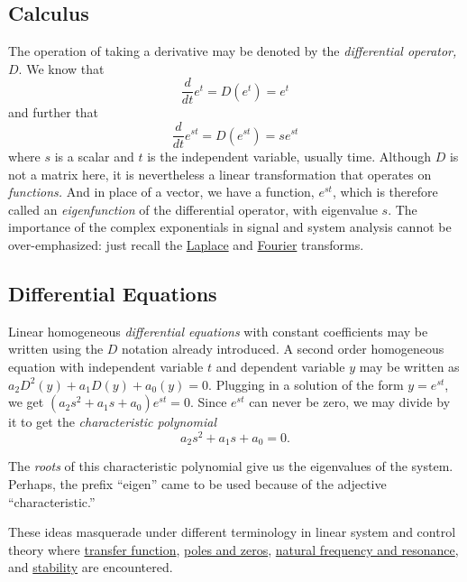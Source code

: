 \documentclass[
  12pt,
  a4paper,
]{article}
\begin{document}
\hypertarget{calculus}{%
\subsection{Calculus}\label{calculus}}

The operation of taking a derivative may be denoted by the
\emph{differential operator,} \(D\). We know that \[
\frac{d}{dt}e^{t} = D(e^{t}) = e^{t}
\] and further that \[
\frac{d}{dt}e^{st} = D(e^{st}) = se^{st}
\] where \(s\) is a scalar and \(t\) is the independent variable,
usually time. Although \(D\) is not a matrix here, it is nevertheless a
linear transformation that operates on \emph{functions.} And in place of
a vector, we have a function, \(e^{st}\), which is therefore called an
\emph{eigenfunction} of the differential operator, with eigenvalue
\(s\). The importance of the complex exponentials in signal and system
analysis cannot be over-emphasized: just recall the
\href{https://en.wikipedia.org/wiki/Laplace_transform}{Laplace} and
\href{https://en.wikipedia.org/wiki/Fourier_transform}{Fourier}
transforms.

\hypertarget{differential-equations}{%
\subsection{Differential Equations}\label{differential-equations}}

Linear homogeneous \emph{differential equations} with constant
coefficients may be written using the \(D\) notation already introduced.
A second order homogeneous equation with independent variable \(t\) and
dependent variable \(y\) may be written as
\(a_2D^2(y) + a_1D(y) + a_0(y) = 0\). Plugging in a solution of the form
\(y = e^{st}\), we get \((a_2s^2 + a_1s + a_0)e^{st} = 0.\) Since
\(e^{st}\) can never be zero, we may divide by it to get the
\emph{characteristic polynomial} \begin{equation}
a_2s^2 + a_1s + a_0 = 0.
\label{eq:cp}\end{equation}

The \emph{roots} of this characteristic polynomial give us the
eigenvalues of the system. Perhaps, the prefix ``eigen'' came to be used
because of the adjective ``characteristic.''

These ideas masquerade under different terminology in linear system and
control theory where
\href{https://en.wikipedia.org/wiki/Transfer_function}{transfer
function},
\href{http://web.mit.edu/2.14/www/Handouts/PoleZero.pdf}{poles and
zeros}, \href{https://www.youtube.com/watch?v=hcXbyS2Cf2o}{natural
frequency and resonance}, and
\href{https://en.wikibooks.org/wiki/Control_Systems/Stability}{stability}
are encountered.
\end{document}
